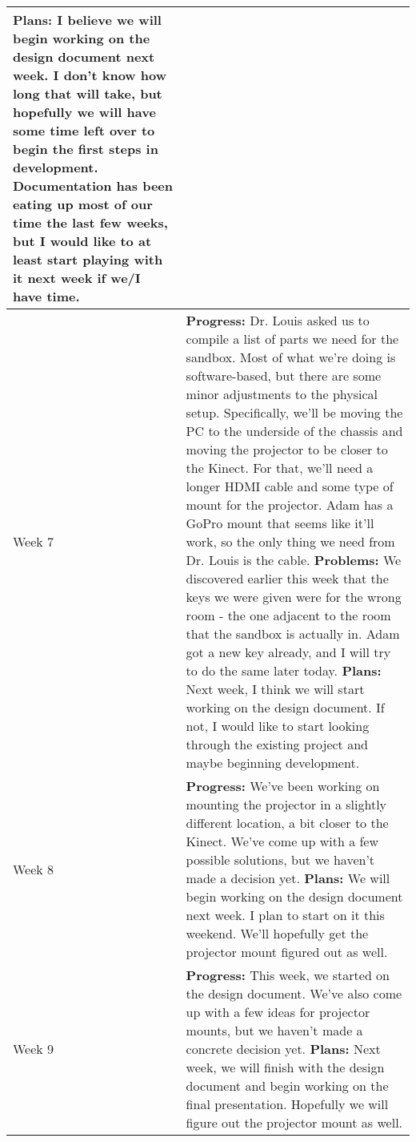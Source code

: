 \documentclass[letterpaper, 10pt, onecolumn, draftclsnofoot]{IEEEtran}
\begin{document}
\begin{center}
\begin{longtable}{|p{4cm}|p{10cm}|}
            \textbf{Plans:} I believe we will begin working on the design document next week. I don't know how long that will take, but hopefully we will have some time left over to begin the first steps in development. Documentation has been eating up most of our time the last few weeks, but I would like to at least start playing with it next week if we/I have time.\\
            \hline
            Week 7 & \textbf{Progress:} Dr. Louis asked us to compile a list of parts we need for the sandbox. Most of what we're doing is software-based, but there are some minor adjustments to the physical setup. Specifically, we'll be moving the PC to the underside of the chassis and moving the projector to be closer to the Kinect. For that, we'll need a longer HDMI cable and some type of mount for the projector. Adam has a GoPro mount that seems like it'll work, so the only thing we need from Dr. Louis is the cable.
            \textbf{Problems:} We discovered earlier this week that the keys we were given were for the wrong room - the one adjacent to the room that the sandbox is actually in. Adam got a new key already, and I will try to do the same later today.
            \textbf{Plans:} Next week, I think we will start working on the design document. If not, I would like to start looking through the existing project and maybe beginning development.\\
            \hline
            Week 8 & \textbf{Progress:} We've been working on mounting the projector in a slightly different location, a bit closer to the Kinect. We've come up with a few possible solutions, but we haven't made a decision yet.
            \textbf{Plans:} We will begin working on the design document next week. I plan to start on it this weekend. We'll hopefully get the projector mount figured out as well.\\
            \hline
            Week 9 & \textbf{Progress:} This week, we started on the design document. We've also come up with a few ideas for projector mounts, but we haven't made a concrete decision yet.
            \textbf{Plans:} Next week, we will finish with the design document and begin working on the final presentation. Hopefully we will figure out the projector mount as well.\\
            \hline
        \end{longtable}
        \end{center}
    
\end{document}
